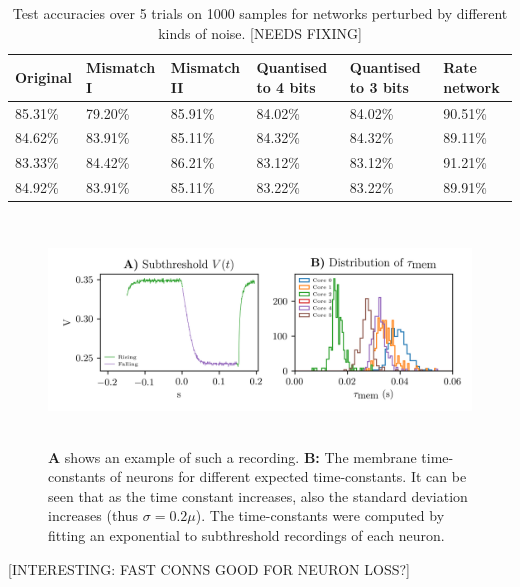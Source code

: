 \documentclass[twoside,11pt,titlepage]{article}
\begin{document}
\begin{table}[!htb]
  \begin{adjustbox}{center} \label{table:table1}
  \begin{tabular}{|l|l|l|l|l|l|}
  \hline
  {Original} & {Mismatch I} & {Mismatch II} & {Quantised to 4 bits} & {Quantised to 3 bits} & {Rate network} \\
  \hline
  {85.31\%}  & {79.20\%}    & {85.91\%}     & {84.02\%}             & {84.02\%}             & {90.51\%}      \\
  {84.62\%}  & {83.91\%}    & {85.11\%}     & {84.32\%}             & {84.32\%}             & {89.11\%}      \\
  {83.33\%}  & {84.42\%}    & {86.21\%}     & {83.12\%}             & {83.12\%}             & {91.21\%}      \\
  {84.92\%}  & {83.91\%}    & {85.11\%}     & {83.22\%}             & {83.22\%}             & {89.91\%}      \\
  \hline
  \end{tabular}
\end{adjustbox}
\caption{Test accuracies over 5 trials on 1000 samples for networks perturbed by different kinds of noise. [NEEDS FIXING]}
\end{table}

\begin{figure}[!htb]
  \includegraphics[width = \columnwidth, height=6cm]{figures/figure5.png}
  \caption{\textbf{A} shows an example of such a recording. \textbf{B:} The membrane time-constants of neurons for different expected time-constants.
  It can be seen that as the time constant increases, also the standard deviation increases (thus $\sigma=0.2\mu$).
  The time-constants were computed by fitting an exponential to subthreshold recordings of each neuron.}
  \label{fig:figure5}
\end{figure}

[INTERESTING: FAST CONNS GOOD FOR NEURON LOSS?]

\clearpage

\vskip 0.2in

\end{document}

